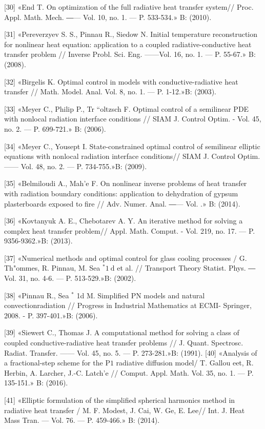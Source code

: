 \documentclass[10pt]{article}
\begin{document}
[30] «End T. On optimization of the full radiative heat transfer system// Proc. Appl. Math. Mech. ―— Vol. 10, no. 1. — P. 533-534.» B: (2010).

[31] «Pereverzyev S. S., Pinnau R., Siedow N. Initial temperature reconstruction for nonlinear heat equation: application to a coupled radiative-conductive heat transfer problem // Inverse Probl. Sci. Eng. ——Vol. 16, no. 1. — P. 55-67.» B: (2008).

[32] «Birgelis K. Optimal control in models with conductive-radiative heat transfer // Math. Model. Anal. Vol. 8, no. 1. — P. 1-12.»B: (2003).

[33] «Meyer C., Philip P., Tr “oltzsch F. Optimal control of a semilinear PDE with nonlocal radiation interface conditions // SIAM J. Control Optim. - Vol. 45, no. 2. — P. 699-721.» B: (2006).

[34] «Meyer C., Yousept I. State-constrained optimal control of semilinear elliptic equations with nonlocal radiation interface conditions// SIAM J. Control Optim. —— Vol. 48, no. 2. — P. 734-755.»B: (2009).

[35] «Belmiloudi A., Mah'e F. On nonlinear inverse problems of heat transfer with radiation boundary conditions: application to dehydration of gypsum plasterboards exposed to fire // Adv. Numer. Anal. ―— Vol. .» B: (2014).

[36] «Kovtanyuk A. E., Chebotarev A. Y. An iterative method for solving a complex heat transfer problem// Appl. Math. Comput. - Vol. 219, no. 17. — P. 9356-9362.»B: (2013).

[37] «Numerical methods and optimal control for glass cooling processes / $\mathrm{G}$. Th"ommes, R. Pinnau, M. Sea ${ }^{*} 1 \mathrm{~d}$ et al. // Transport Theory Statist. Phys. ― Vol. 31, no. 4-6. — P. 513-529.»B: (2002).

[38] «Pinnau R., Sea ${ }^{*}$ 1d M. Simplified PN models and natural convectionradiation // Progress in Industrial Mathematics at ECMI- Springer, 2008. - P. 397-401.»B: (2006).

[39] «Siewert C., Thomas J. A computational method for solving a class of coupled conductive-radiative heat transfer problems // J. Quant. Spectrosc. Radiat. Transfer. —— Vol. 45, no. 5. — P. 273-281.»B: (1991). [40] «Analysis of a fractional-step scheme for the $\mathrm{P} 1$ radiative diffusion model/ T. Gallou eet, R. Herbin, A. Larcher, J.-C. Latch'e // Comput. Appl. Math. Vol. 35, no. 1. — P. 135-151.» B: (2016).

[41] «Elliptic formulation of the simplified spherical harmonics method in radiative heat transfer / M. F. Modest, J. Cai, W. Ge, E. Lee// Int. J. Heat Mass Tran. — Vol. 76. — P. 459-466.» B: (2014).
\end{document}

